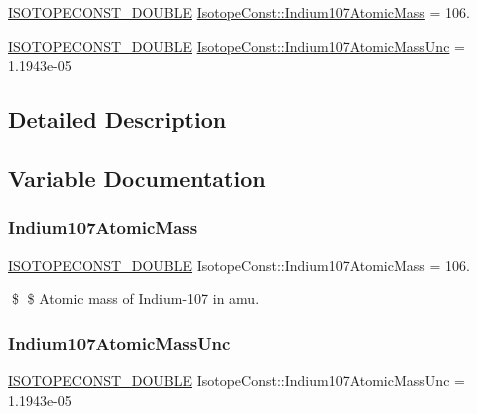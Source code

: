 \begin{DoxyCompactItemize}
\item 
\mbox{\hyperlink{group___isotope_const-_macros_ga8f45a7272ce02c0b4c65c44636ed719a}{I\+S\+O\+T\+O\+P\+E\+C\+O\+N\+S\+T\+\_\+\+D\+O\+U\+B\+LE}} \mbox{\hyperlink{group___isotope_const-_indium-_in107_gae9cfe9bb3b763b7cd6bf6dbf7e45b88d}{Isotope\+Const\+::\+Indium107\+Atomic\+Mass}} = 106.
\item 
\mbox{\hyperlink{group___isotope_const-_macros_ga8f45a7272ce02c0b4c65c44636ed719a}{I\+S\+O\+T\+O\+P\+E\+C\+O\+N\+S\+T\+\_\+\+D\+O\+U\+B\+LE}} \mbox{\hyperlink{group___isotope_const-_indium-_in107_ga236af7bd9979e1131e6109960d54734a}{Isotope\+Const\+::\+Indium107\+Atomic\+Mass\+Unc}} = 1.\+1943e-\/05
\end{DoxyCompactItemize}


\subsection{Detailed Description}


\subsection{Variable Documentation}
\mbox{\label{group___isotope_const-_indium-_in107_gae9cfe9bb3b763b7cd6bf6dbf7e45b88d}} 
\subsubsection{\texorpdfstring{Indium107\+Atomic\+Mass}{Indium107AtomicMass}}
{\footnotesize\ttfamily \mbox{\hyperlink{group___isotope_const-_macros_ga8f45a7272ce02c0b4c65c44636ed719a}{I\+S\+O\+T\+O\+P\+E\+C\+O\+N\+S\+T\+\_\+\+D\+O\+U\+B\+LE}} Isotope\+Const\+::\+Indium107\+Atomic\+Mass = 106.}

\$ \$ Atomic mass of Indium-\/107 in amu. \mbox{\label{group___isotope_const-_indium-_in107_ga236af7bd9979e1131e6109960d54734a}} 
\subsubsection{\texorpdfstring{Indium107\+Atomic\+Mass\+Unc}{Indium107AtomicMassUnc}}
{\footnotesize\ttfamily \mbox{\hyperlink{group___isotope_const-_macros_ga8f45a7272ce02c0b4c65c44636ed719a}{I\+S\+O\+T\+O\+P\+E\+C\+O\+N\+S\+T\+\_\+\+D\+O\+U\+B\+LE}} Isotope\+Const\+::\+Indium107\+Atomic\+Mass\+Unc = 1.\+1943e-\/05}

